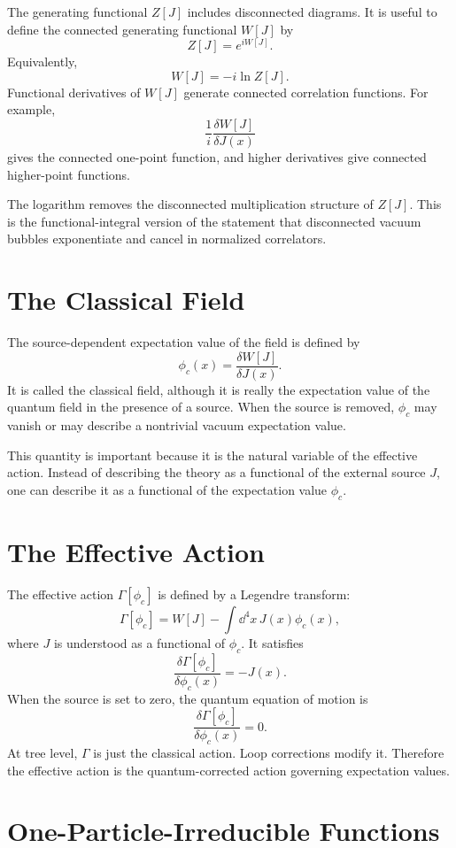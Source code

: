 The generating functional \(Z[J]\) includes disconnected diagrams. It is useful
to define the connected generating functional \(W[J]\) by
\[
    Z[J]=e^{iW[J]}.
\]
Equivalently,
\[
    W[J]=-i\ln Z[J].
\]
Functional derivatives of \(W[J]\) generate connected correlation functions.
For example,
\[
    \frac{1}{i}\frac{\delta W[J]}{\delta J(x)}
\]
gives the connected one-point function, and higher derivatives give connected
higher-point functions.

The logarithm removes the disconnected multiplication structure of \(Z[J]\).
This is the functional-integral version of the statement that disconnected
vacuum bubbles exponentiate and cancel in normalized correlators.

\section{The Classical Field}

The source-dependent expectation value of the field is defined by
\[
    \phi_c(x)
    = \frac{\delta W[J]}{\delta J(x)}.
\]
It is called the classical field, although it is really the expectation value of
the quantum field in the presence of a source. When the source is removed,
\(\phi_c\) may vanish or may describe a nontrivial vacuum expectation value.

This quantity is important because it is the natural variable of the effective
action. Instead of describing the theory as a functional of the external source
\(J\), one can describe it as a functional of the expectation value \(\phi_c\).

\section{The Effective Action}

The effective action \(\Gamma[\phi_c]\) is defined by a Legendre transform:
\[
    \Gamma[\phi_c]
    = W[J]-\int\dd^4x\,J(x)\phi_c(x),
\]
where \(J\) is understood as a functional of \(\phi_c\). It satisfies
\[
    \frac{\delta\Gamma[\phi_c]}{\delta\phi_c(x)}=-J(x).
\]
When the source is set to zero, the quantum equation of motion is
\[
    \frac{\delta\Gamma[\phi_c]}{\delta\phi_c(x)}=0.
\]
At tree level, \(\Gamma\) is just the classical action. Loop corrections modify
it. Therefore the effective action is the quantum-corrected action governing
expectation values.

\section{One-Particle-Irreducible Functions}

